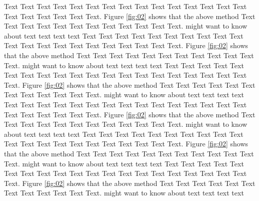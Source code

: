 \documentclass{Rpd}
\begin{document}
Text Text Text Text Text Text  Text Text Text Text Text Text Text Text Text  Text Text Text Text Text Text. Figure \ref{fig:02} shows that the above method  Text Text Text Text  Text Text Text Text Text Text  Text Text.  \cite{Boffelli03} might want to know about  text text text text
Text Text Text Text Text Text  Text Text Text Text Text Text Text Text Text  Text Text Text Text Text Text. Figure \ref{fig:02} shows that the above method  Text Text Text Text  Text Text Text Text Text Text  Text Text.  \cite{Boffelli03} might want to know about  text text text text
Text Text Text Text Text Text  Text Text Text Text Text Text Text Text Text  Text Text Text Text Text Text. Figure \ref{fig:02} shows that the above method  Text Text Text Text  Text Text Text Text Text Text  Text Text.  \cite{Boffelli03} might want to know about  text text text text
Text Text Text Text Text Text  Text Text Text Text Text Text Text Text Text  Text Text Text Text Text Text. Figure \ref{fig:02} shows that the above method  Text Text Text Text  Text Text Text Text Text Text  Text Text.  \cite{Boffelli03} might want to know about  text text text text
Text Text Text Text Text Text  Text Text Text Text Text Text Text Text Text  Text Text Text Text Text Text. Figure \ref{fig:02} shows that the above method  Text Text Text Text  Text Text Text Text Text Text  Text Text.  \cite{Boffelli03} might want to know about  text text text text
Text Text Text Text Text Text  Text Text Text Text Text Text Text Text Text  Text Text Text Text Text Text. Figure \ref{fig:02} shows that the above method  Text Text Text Text  Text Text Text Text Text Text  Text Text.  \cite{Boffelli03} might want to know about  text text text text
\end{document}
